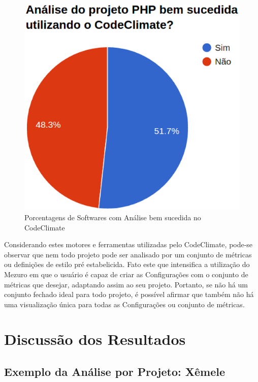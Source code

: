 \begin{figure}[!htb]
	\centering
    \includegraphics[keepaspectratio=true,scale=0.6]
    {figuras/is_codeclimate_php_success.eps}
  \caption{Porcentagens de Softwares com Análise bem sucedida no CodeClimate}
  \label{fig:is_codeclimate_php_success}
\end{figure}

\newpage

Considerando estes motores e ferramentas utilizadas pelo CodeClimate, pode-se
observar que nem todo projeto pode ser analisado por um conjunto de métricas ou
definições de estilo pré estabelicida. Fato este que intensifica a utilização do
Mezuro em que o usuário é capaz de criar as Configurações com o conjunto de
métricas que desejar, adaptando assim ao seu projeto. Portanto, se não há um
conjunto fechado ideal para todo projeto, é possível afirmar que também não há
uma visualização única para todas as Configurações ou conjunto de métricas.


\section{Discussão dos Resultados}

\subsection{Exemplo da Análise por Projeto: Xêmele}

